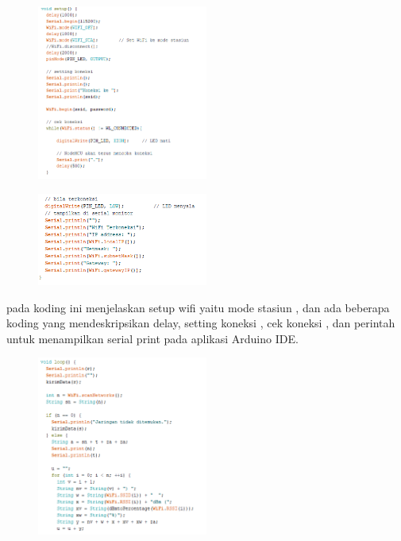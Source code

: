 \documentclass[conference]{IEEEtran}
\begin{document}
\begin{figure}[h]
    \centering
    \includegraphics[width=0.5\textwidth]{codingesp2.png}
\end{figure}



\vspace{7cm}

\begin{figure}[h]
    \centering
    \includegraphics[width=0.5\textwidth]{codingesp3.png}
\end{figure}
pada koding ini menjelaskan setup wifi yaitu mode stasiun , dan ada beberapa
koding yang mendeskripsikan delay, setting koneksi , cek koneksi , dan perintah untuk menampilkan serial print pada aplikasi Arduino IDE.

\begin{figure}[h]
    \centering
    \includegraphics[width=0.5\textwidth]{codingesp4.png}
\end{figure}
\end{document}
